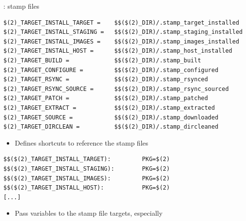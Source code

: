 \begin{frame}[fragile]{: stamp files}

\begin{block}{}
\begin{verbatim}
$(2)_TARGET_INSTALL_TARGET =    $$($(2)_DIR)/.stamp_target_installed
$(2)_TARGET_INSTALL_STAGING =   $$($(2)_DIR)/.stamp_staging_installed
$(2)_TARGET_INSTALL_IMAGES =    $$($(2)_DIR)/.stamp_images_installed
$(2)_TARGET_INSTALL_HOST =      $$($(2)_DIR)/.stamp_host_installed
$(2)_TARGET_BUILD =             $$($(2)_DIR)/.stamp_built
$(2)_TARGET_CONFIGURE =         $$($(2)_DIR)/.stamp_configured
$(2)_TARGET_RSYNC =             $$($(2)_DIR)/.stamp_rsynced
$(2)_TARGET_RSYNC_SOURCE =      $$($(2)_DIR)/.stamp_rsync_sourced
$(2)_TARGET_PATCH =             $$($(2)_DIR)/.stamp_patched
$(2)_TARGET_EXTRACT =           $$($(2)_DIR)/.stamp_extracted
$(2)_TARGET_SOURCE =            $$($(2)_DIR)/.stamp_downloaded
$(2)_TARGET_DIRCLEAN =          $$($(2)_DIR)/.stamp_dircleaned
\end{verbatim}
\end{block}

\begin{itemize}
\item Defines shortcuts to reference the stamp files
\end{itemize}

\begin{block}{}
\begin{verbatim}
$$($(2)_TARGET_INSTALL_TARGET):         PKG=$(2)
$$($(2)_TARGET_INSTALL_STAGING):        PKG=$(2)
$$($(2)_TARGET_INSTALL_IMAGES):         PKG=$(2)
$$($(2)_TARGET_INSTALL_HOST):           PKG=$(2)
[...]
\end{verbatim}
\end{block}

\begin{itemize}
\item Pass variables to the stamp file targets, especially 
\end{itemize}

\end{frame}


